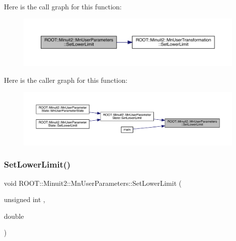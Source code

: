 Here is the call graph for this function\+:
\nopagebreak
\begin{figure}[H]
\begin{center}
\leavevmode
\includegraphics[width=350pt]{d6/d10/classROOT_1_1Minuit2_1_1MnUserParameters_a5fa6d9f50413c05aabed1d11ee26c6cc_cgraph}
\end{center}
\end{figure}
Here is the caller graph for this function\+:
\nopagebreak
\begin{figure}[H]
\begin{center}
\leavevmode
\includegraphics[width=350pt]{d6/d10/classROOT_1_1Minuit2_1_1MnUserParameters_a5fa6d9f50413c05aabed1d11ee26c6cc_icgraph}
\end{center}
\end{figure}
\mbox{\label{classROOT_1_1Minuit2_1_1MnUserParameters_a5fa6d9f50413c05aabed1d11ee26c6cc}} 
\subsubsection{\texorpdfstring{SetLowerLimit()}{SetLowerLimit()}\hspace{0.1cm}{\footnotesize\ttfamily [2/6]}}
{\footnotesize\ttfamily void R\+O\+O\+T\+::\+Minuit2\+::\+Mn\+User\+Parameters\+::\+Set\+Lower\+Limit (\begin{DoxyParamCaption}\item[{unsigned int}]{,  }\item[{double}]{ }\end{DoxyParamCaption})}

\mbox{\label{classROOT_1_1Minuit2_1_1MnUserParameters_a5fa6d9f50413c05aabed1d11ee26c6cc}} 
